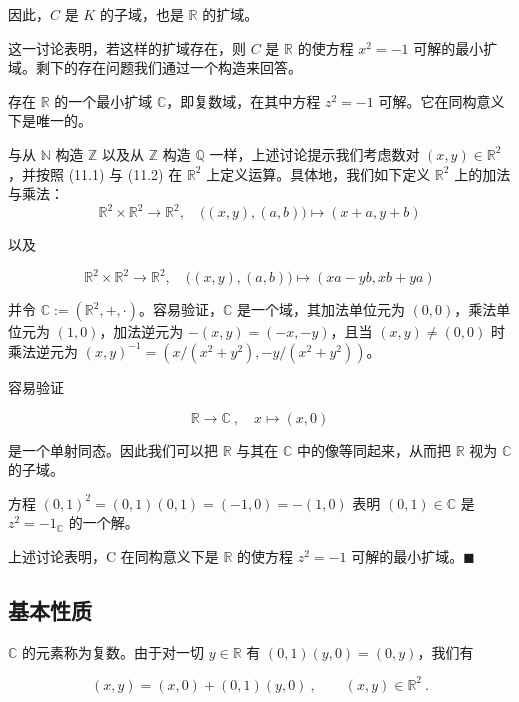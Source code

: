 因此，$C$ 是 $K$ 的子域，也是 $\mathbb{R}$ 的扩域。

这一讨论表明，若这样的扩域存在，则 $C$ 是 $\mathbb{R}$ 的使方程 $x^{2} = -1$ 可解的最小扩域。剩下的存在问题我们通过一个构造来回答。

\begin{theorem}

存在 $ \mathbb{R} $ 的一个最小扩域 $ \mathbb{C} $，即复数域，在其中方程 $ z^2 = -1 $ 可解。它在同构意义下是唯一的。

\proofhead
与从 $\mathbb{N}$ 构造 $\mathbb{Z}$ 以及从 $\mathbb{Z}$ 构造 $\mathbb{Q}$ 一样，上述讨论提示我们考虑数对 $(x, y) \in \mathbb{R}^2$，并按照 (11.1) 与 (11.2) 在 $\mathbb{R}^2$ 上定义运算。具体地，我们如下定义 $\mathbb{R}^2$ 上的加法与乘法：
\[
\mathbb{R}^{2}\times\mathbb{R}^{2}\to\mathbb{R}^{2},\quad\big((x,y),(a,b)\big)\mapsto(x+a,y+b)
\]

以及

\[
\mathbb{R}^{2}\times\mathbb{R}^{2}\to\mathbb{R}^{2},\quad\big((x,y),(a,b)\big)\mapsto(x a-y b,x b+y a)
\]

并令 $\mathbb{C} := (\mathbb{R}^2, +, \cdot)$。容易验证，$\mathbb{C}$ 是一个域，其加法单位元为 $(0,0)$，乘法单位元为 $(1,0)$，加法逆元为 $-(x,y) = (-x, -y)$，且当 $(x, y) \neq (0,0)$ 时乘法逆元为 $(x, y)^{-1} = \left(x/(x^2 + y^2), -y/(x^2 + y^2)\right)$。

容易验证

\begin{equation}
\mathbb{R}\to\mathbb{C}\ ,\quad x\mapsto(x,0)
\end{equation}

是一个单射同态。因此我们可以把 $ \mathbb{R} $ 与其在 $ \mathbb{C} $ 中的像等同起来，从而把 $ \mathbb{R} $ 视为 $ \mathbb{C} $ 的子域。

方程 $(0,1)^2 = (0,1)(0,1) = (-1,0) = -(1,0)$ 表明 $(0,1) \in \mathbb{C}$ 是 $z^2 = -1_{\mathbb{C}}$ 的一个解。

上述讨论表明，C 在同构意义下是 $ \mathbb{R} $ 的使方程 $ z^2 = -1 $ 可解的最小扩域。$ \blacksquare $

\end{theorem}

\subsection*{基本性质}

$ \mathbb{C} $ 的元素称为复数。由于对一切 $ y \in \mathbb{R} $ 有 $ (0,1)(y,0)=(0,y) $，我们有

\[
(x,y)=(x,0)+(0,1)(y,0)~,\qquad(x,y)\in\mathbb{R}^{2}~.
\]

